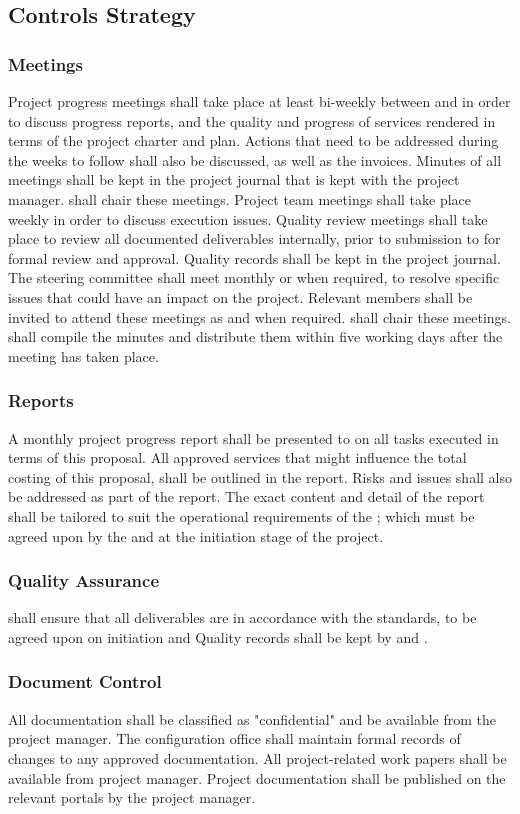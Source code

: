 \subsection{Controls Strategy}
\subsubsection{Meetings}
\slist
\spit Project progress meetings shall take place at least bi-weekly between \client and \client in order to discuss progress reports, and the quality and progress of services rendered in terms of the project charter and plan. Actions that need to be addressed during the weeks to follow shall also be discussed, as well as the invoices. Minutes of all meetings shall be kept in the project journal that is kept with the \client project manager. \client shall chair these meetings.
\spit Project team meetings shall take place weekly in order to discuss execution issues. 
\spit Quality review meetings shall take place to review all documented deliverables internally, prior to submission to \client for formal review and approval. Quality records shall be kept in the project journal.
\spit The steering committee shall meet monthly or when required, to resolve specific issues that could have an impact on the project. Relevant members shall be invited to attend these meetings as and when required. \client shall chair these meetings. \client shall compile the minutes and distribute them within five working days after the meeting has taken place.
\elist
\subsubsection{Reports}
A monthly project progress report shall be presented to \client on all tasks executed in terms of this proposal. All approved services that might influence the total costing of this proposal, shall be outlined in the report. Risks and issues shall also be addressed as part of the report. The exact content and detail of the report shall be tailored to suit the operational requirements of the \client; which must be agreed upon by the \vendor and \client at the initiation stage of the project.
\subsubsection{Quality Assurance}
\vendor shall ensure that all deliverables are in accordance with the \client standards, to be agreed upon on initiation and
Quality records shall be kept by \vendor and \client.
\subsubsection{Document Control}
\slist 
\spit All documentation shall be classified as "confidential" and be available from the \client project manager.
\spit The \client configuration office shall maintain formal records of changes to any approved documentation.
\spit All project-related work papers shall be available from \clients project manager.
\spit Project documentation shall be published on the relevant \client portals by the \client project manager.
\elist
